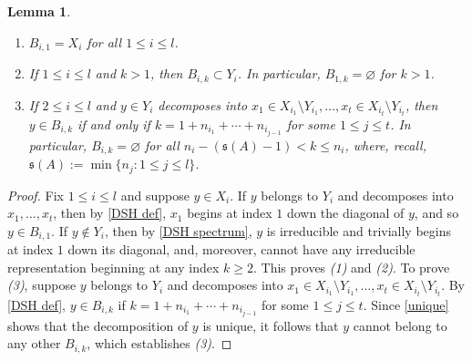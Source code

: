 \documentclass[12pt]{amsart}
\numberwithin{equation}{section}
\newtheorem{lemma}[theorem]{Lemma}
\theoremstyle{definition}
\newtheorem{definition}[theorem]{Definition}
\theoremstyle{remark}
\begin{document}
\begin{lemma}
	\label{Bik}
	\mbox{}
	\begin{enumerate}
		\item $B_{i,1}=X_{i}$ for all $1\leq i\leq  l$.
		\item If $1\leq i\leq  l$ and $k>1$, then $B_{i,k}\subset Y_{i}$.	In particular, $B_{1,k}=\varnothing$ for $k>1$.
		\item If $2\leq i\leq  l$ and $y\in Y_{i}$ decomposes into $x_{1}\in X_{i_{1}}\setminus Y_{i_{1}},\ldots,x_{t}\in X_{i_{t}}\setminus Y_{i_{t}}$, then $y\in B_{i,k}$ if and only if $k=1+n_{i_{1}}+\cdots+n_{i_{j-1}}$ for some $1\leq j\leq t$. In particular, $B_{i,k}=\varnothing$ for all $n_{i}-(\mathfrak{s}(A)-1)< k\leq n_{i}$, where, recall, $\mathfrak{s}(A):=\min\{n_{j}:1\leq j\leq  l\}$. 
	\end{enumerate}
\end{lemma}

\begin{proof}
	Fix $1\leq i\leq l$ and suppose $y\in X_{i}$. If $y$ belongs to $Y_{i}$ and decomposes into $x_{1},\ldots,x_{t}$, then by \autoref{DSH def}, $x_{1}$ begins at index $1$ down the diagonal of $y$, and so $y\in B_{i,1}$. If $y\notin Y_{i}$, then by \autoref{DSH spectrum}, $y$ is irreducible and trivially begins at index $1$ down its diagonal, and, moreover, cannot have any irreducible representation beginning at any index $k\geq 2$. This proves \textit{(1)} and \textit{(2)}. To prove \textit{(3)}, suppose $y$ belongs to $Y_{i}$ and decomposes into $x_{1}\in X_{i_{1}}\setminus Y_{i_{1}},\ldots,x_{t}\in X_{i_{t}}\setminus Y_{i_{t}}$. By \autoref{DSH def}, $y\in B_{i,k}$ if $k=1+n_{i_{1}}+\cdots+n_{i_{j-1}}$ for some $1\leq j\leq t$. Since \autoref{unique} shows that the decomposition of $y$ is unique, it follows that $y$ cannot belong to any other $B_{i,k}$, which establishes \textit{(3)}.
\end{proof}



\end{document}
